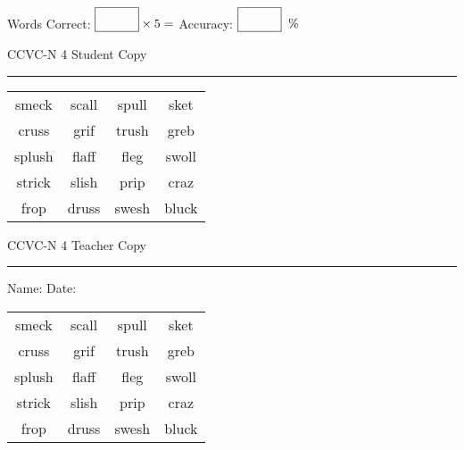 \documentclass{memoir}
\begin{document}
\small

Words Correct: $\fbox{\phantom{\huge 100}} \times 5 = $ Accuracy: $\fbox{\phantom{\huge 100}}\;\; \%$ 

\vfill

\newpage


\footnotesize \noindent
CCVC-N 4 \hfill Student Copy
\smallskip
\hrule

\Large

\setlength{\tabcolsep}{14pt}
\def\arraystretch{3}

{\selectfont


\begin{vplace}[0.5]
\begin{center}
\begin{tabular}{cccc}
smeck & scall & spull & sket \\
cruss & grif      & trush & greb \\
splush & flaff & fleg             & swoll \\
strick & slish & prip & craz       \\
frop & druss & swesh & bluck            \\
\end{tabular}
\end{center}
\end{vplace}

}

\newpage

\footnotesize \noindent
CCVC-N 4 \hfill Teacher Copy
\smallskip
\hrule

\small

\vfill

\noindent
Name: \underline{\hspace{1.75in}} \hfill Date: \underline{\hspace{1in}}

\Large

{\selectfont


\begin{vplace}[0.5]
\begin{center}
\begin{tabular}{cccc}
smeck & scall & spull & sket \\
cruss & grif      & trush & greb \\
splush & flaff & fleg             & swoll \\
strick & slish & prip & craz       \\
frop & druss & swesh & bluck            \\
\end{tabular}
\end{center}
\end{vplace}



}
\end{document}
